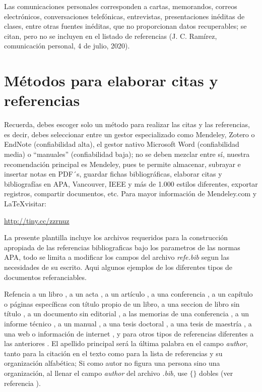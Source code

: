 Las comunicaciones personales corresponden a cartas, memorandos, correos electrónicos, conversaciones telefónicas, entrevistas, presentaciones inéditas de clases, entre otras fuentes inéditas, que no proporcionan datos recuperables; se citan, pero no se incluyen en el listado de referencias (J. C. Ramírez, comunicación personal, 4 de julio, 2020).

\newpage
\section{Métodos para elaborar citas y referencias }

Recuerda, debes escoger solo un método para realizar las citas y las referencias, es decir, debes seleccionar entre un gestor especializado como Mendeley, Zotero o EndNote (confiabilidad alta), el gestor nativo Microsoft Word (confiabilidad media) o “manuales” (confiabilidad baja); no se deben mezclar entre sí, nuestra recomendación principal es Mendeley, pues te permite almacenar, subrayar e insertar notas en PDF´s, guardar fichas bibliográficas, elaborar citas y bibliografías en APA, Vancouver, IEEE y más de 1.000 estilos diferentes, exportar registros, compartir documentos, etc. Para mayor información de Mendeley.com y \LaTeX visitar:

\url{http://tiny.cc/zzrnuz}

La presente plantilla incluye los archivos requeridos para la construcción apropiada de las referencias bibliograficas bajo los parametros de las normas APA, todo se limita a modificar los campos del archivo \textit{refe.bib} segun las necesidades de su escrito. Aqui algunos ejemplos de los diferentes tipos de documentos referanciables.

Refencia a un libro \citep{lib:libro},  a un acta \citep{act:acta}, a un artículo \citep{art:articulo}, a una conferencia \citep{con:conferencia}, a un capítulo o páginas específicas con título propio de un libro\citep{ent:entre_libro}, a una seccion de libro sin título \citep{sec:seccion_libro}, a un documento sin editorial \citep{fll:folleto}, a las memorias de una conferencia \citep{ina:articulo_en_acta}, a un informe técnico \citep{inf:informe_tecnico}, a un manual \citep{man:manual}, a una tesis doctoral \citep{phd:phd_tesis}, a una tesis de maestría \citep{tes:tesis}, a una web o información de internet \citep{web:web}, y para otros tipos de referencias diferentes a las anteriores \citep{opc:opcional}. El apellido principal será la última palabra en el campo \textit{author}, tanto para la citación en el texto como para la lista de referencias y su organización alfabética; Si como autor no figura una persona sino una organización, al llenar el campo \textit{author} del archivo \textit{.bib}, use $\{\}$ dobles (ver referencia \citep{lib:apa}).


